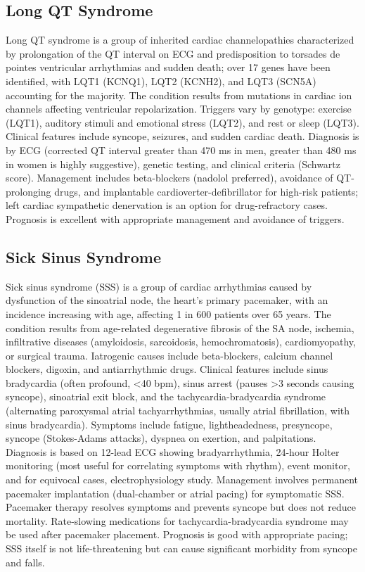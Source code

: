 \subsection{Long QT Syndrome}
\label{sec:Long QT Syndrome}
Long QT syndrome is a group of inherited cardiac channelopathies characterized by prolongation of the QT interval on ECG and predisposition to torsades de pointes ventricular arrhythmias and sudden death; over 17 genes have been identified, with LQT1 (KCNQ1), LQT2 (KCNH2), and LQT3 (SCN5A) accounting for the majority. The condition results from mutations in cardiac ion channels affecting ventricular repolarization. Triggers vary by genotype: exercise (LQT1), auditory stimuli and emotional stress (LQT2), and rest or sleep (LQT3). Clinical features include syncope, seizures, and sudden cardiac death. Diagnosis is by ECG (corrected QT interval greater than 470 ms in men, greater than 480 ms in women is highly suggestive), genetic testing, and clinical criteria (Schwartz score). Management includes beta-blockers (nadolol preferred), avoidance of QT-prolonging drugs, and implantable cardioverter-defibrillator for high-risk patients; left cardiac sympathetic denervation is an option for drug-refractory cases. Prognosis is excellent with appropriate management and avoidance of triggers.

\subsection{Sick Sinus Syndrome}
\label{sec:Sick Sinus Syndrome}
Sick sinus syndrome (SSS) is a group of cardiac arrhythmias caused by dysfunction of the sinoatrial node, the heart's primary pacemaker, with an incidence increasing with age, affecting 1 in 600 patients over 65 years. The condition results from age-related degenerative fibrosis of the SA node, ischemia, infiltrative diseases (amyloidosis, sarcoidosis, hemochromatosis), cardiomyopathy, or surgical trauma. Iatrogenic causes include beta-blockers, calcium channel blockers, digoxin, and antiarrhythmic drugs. Clinical features include sinus bradycardia (often profound, <40 bpm), sinus arrest (pauses >3 seconds causing syncope), sinoatrial exit block, and the tachycardia-bradycardia syndrome (alternating paroxysmal atrial tachyarrhythmias, usually atrial fibrillation, with sinus bradycardia). Symptoms include fatigue, lightheadedness, presyncope, syncope (Stokes-Adams attacks), dyspnea on exertion, and palpitations. Diagnosis is based on 12-lead ECG showing bradyarrhythmia, 24-hour Holter monitoring (most useful for correlating symptoms with rhythm), event monitor, and for equivocal cases, electrophysiology study. Management involves permanent pacemaker implantation (dual-chamber or atrial pacing) for symptomatic SSS. Pacemaker therapy resolves symptoms and prevents syncope but does not reduce mortality. Rate-slowing medications for tachycardia-bradycardia syndrome may be used after pacemaker placement. Prognosis is good with appropriate pacing; SSS itself is not life-threatening but can cause significant morbidity from syncope and falls.

